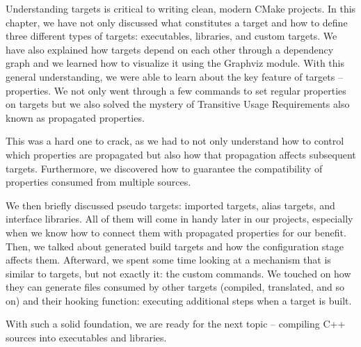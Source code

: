 Understanding targets is critical to writing clean, modern CMake projects. In this chapter, we have not only discussed what constitutes a target and how to define three different types of targets: executables, libraries, and custom targets. We have also explained how targets depend on each other through a dependency graph and we learned how to visualize it using the Graphviz module. With this general understanding, we were able to learn about the key feature of targets – properties. We not only went through a few commands to set regular properties on targets but we also solved the mystery of Transitive Usage Requirements also known as propagated properties.

This was a hard one to crack, as we had to not only understand how to control which properties are propagated but also how that propagation affects subsequent targets. Furthermore, we discovered how to guarantee the compatibility of properties consumed from multiple sources.

We then briefly discussed pseudo targets: imported targets, alias targets, and interface libraries. All of them will come in handy later in our projects, especially when we know how to connect them with propagated properties for our benefit. Then, we talked about generated build targets and how the configuration stage affects them. Afterward, we spent some time looking at a mechanism that is similar to targets, but not exactly it: the custom commands. We touched on how they can generate files consumed by other targets (compiled, translated, and so on) and their hooking function: executing additional steps when a target is built.

With such a solid foundation, we are ready for the next topic – compiling C++ sources into executables and libraries.